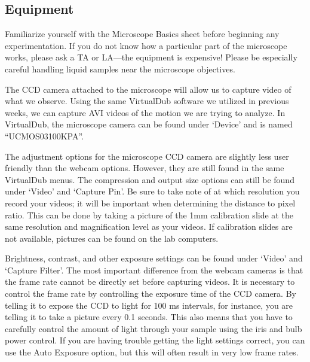 \subsection*{Equipment}
Familiarize yourself with the Microscope Basics sheet before beginning any experimentation. 
If you do not know how a particular part of the microscope works, please ask a TA or LA—the equipment is expensive! 
Please be especially careful handling liquid samples near the microscope objectives. 
\par
The CCD camera attached to the microscope will allow us to capture video of what we observe. 
Using the same VirtualDub software we utilized in previous weeks, we can capture AVI videos of the motion we are trying to analyze. 
In VirtualDub, the microscope camera can be found under `Device' and is named ``UCMOS03100KPA''. 
\par  
The adjustment options for the microscope CCD camera are slightly less user friendly than the webcam options. 
However, they are still found in the same VirtualDub menus. 
The compression and output size options can still be found under `Video' and `Capture Pin'. 
Be sure to take note of at which resolution you record your videos; it will be important when determining the distance to pixel ratio. 
This can be done by taking a picture of the 1mm calibration slide at the same resolution and magnification level as your videos. 
If calibration slides are not available, pictures can be found on the lab computers. 
\par 
Brightness, contrast, and other exposure settings can be found under `Video' and `Capture Filter'. 
The most important difference from the webcam cameras is that the frame rate cannot be directly set before capturing videos. 
It is necessary to control the frame rate by controlling the exposure time of the CCD camera. 
By telling it to expose the CCD to light for 100 ms intervals, for instance, you are telling it to take a picture every 0.1 seconds.
This also means that you have to carefully control the amount of light through your sample using the iris and bulb power control. 
If you are having trouble getting the light settings correct, you can use the Auto Exposure option, but this will often result in very low frame rates.

